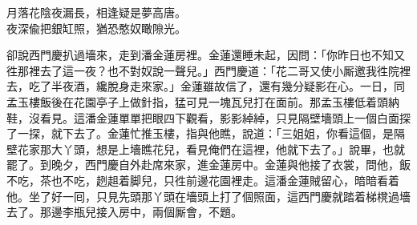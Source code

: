 \begin{myquote}
月落花陰夜漏長，相逢疑是夢高唐。\\夜深偸把銀缸照，猶恐憨奴瞰隙光。
\end{myquote}

卻說西門慶扒過墻來，走到潘金蓮房裡。金蓮還睡未起，因問：「你昨日也不知又徃那裡去了這一夜？也不對奴說一聲兒。」西門慶道：「花二哥又使小厮邀我徃院裡去，吃了半夜酒，纔脫身走來家。」金蓮雖故信了，還有幾分疑影在心。一日，同孟玉樓飯後在花園亭子上做針指，猛可見一塊瓦兒打在面前。那孟玉樓低着頭納鞋，沒看見。這潘金蓮單單把眼四下觀看，影影綽綽，只見隔壁墻頭上一個白面探了一探，就下去了。金蓮忙推玉樓，指與他瞧，說道：「三姐姐，你看這個，是隔壁花家那大丫頭，想是上墻瞧花兒，看見俺們在這裡，他就下去了。」說畢，也就罷了。到晚夕，西門慶自外赴席來家，進金蓮房中。金蓮與他接了衣裳，問他，飯不吃，茶也不吃，趔趄着脚兒，只徃前邊花園裡走。{}這潘金蓮賊留心，暗暗看着他。坐了好一囘，只見先頭那丫頭在墻頭上打了個照面，這西門慶就踏着梯櫈過墻去了。那邊李瓶兒接入房中，兩個厮會，不題。

